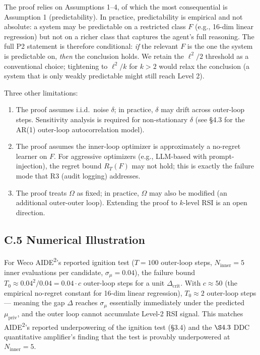 \documentclass{article}
\theoremstyle{definition}
\begin{document}
The proof relies on Assumptions 1--4, of which the most consequential is Assumption 1 (predictability). In practice, predictability is empirical and not absolute: a system may be predictable on a restricted class $F$ (e.g., 16-dim linear regression) but not on a richer class that captures the agent's full reasoning. The full P2 statement is therefore conditional: \emph{if} the relevant $F$ is the one the system is predictable on, \emph{then} the conclusion holds. We retain the $\ell^2/2$ threshold as a conventional choice; tightening to $\ell^2/k$ for $k > 2$ would relax the conclusion (a system that is only weakly predictable might still reach Level 2).

Three other limitations:
\begin{enumerate}
    \item The proof assumes i.i.d.\ noise $\delta$; in practice, $\delta$ may drift across outer-loop steps. Sensitivity analysis is required for non-stationary $\delta$ (see \S4.3 for the AR(1) outer-loop autocorrelation model).
    \item The proof assumes the inner-loop optimizer is approximately a no-regret learner on $F$. For aggressive optimizers (e.g., LLM-based with prompt-injection), the regret bound $R_T(F)$ may not hold; this is exactly the failure mode that R3 (audit logging) addresses.
    \item The proof treats $\Omega$ as fixed; in practice, $\Omega$ may also be modified (an additional outer-outer loop). Extending the proof to $k$-level RSI is an open direction.
\end{enumerate}

\subsection*{C.5 Numerical Illustration}

For Weco AIDE\textsuperscript{2}'s reported ignition test ($T = 100$ outer-loop steps, $N_{\text{inner}} = 5$ inner evaluations per candidate, $\sigma_\mu = 0.04$), the failure bound $T_0 \approx 0.04^2 / 0.04 = 0.04 \cdot c$ outer-loop steps for a unit $\Delta_{\text{crit}}$. With $c \approx 50$ (the empirical no-regret constant for 16-dim linear regression), $T_0 \approx 2$ outer-loop steps --- meaning the gap $\Delta$ reaches $\sigma_\mu$ essentially immediately under the predicted $\mu_{\text{priv}}$, and the outer loop cannot accumulate Level-2 RSI signal. This matches AIDE\textsuperscript{2}'s reported underpowering of the ignition test (\S3.4) and the $\S4.3$ DDC quantitative amplifier's finding that the test is provably underpowered at $N_{\text{inner}} = 5$.
\end{document}
